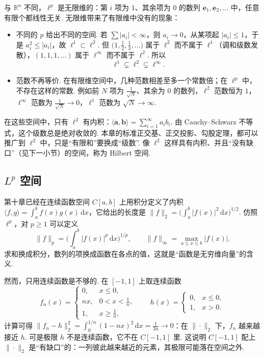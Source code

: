 \documentclass[lang=cn,10.5pt,scheme=chinese,toc=twocol,section,chinesefont=nofont,
twoside,citestyle=gb7714-2015,bibstyle=gb7714-2015]{elegantbook}
\DeclareRobustCommand{\textbf}[1]{{\lnsemiboldlatin\lnsemiboldcjk #1}}
\newcommand{\vv}[1]{\boldsymbol{#1}}
\numberwithin{equation}{section}   %
\begin{document}
与 $\mathbb{R}^n$ 不同，$\ell^p$ 是无限维的：第 $i$ 项为 $1$、其余项为 $0$ 的数列 $\vv e_1,\vv e_2,\ldots$ 中，任意有限个都线性无关. 无限维带来了有限维中没有的现象：
\begin{itemize}
  \item \textbf{不同的 $p$ 给出不同的空间.} 若 $\sum|a_i|<\infty$，则 $a_i\to0$，从某项起 $|a_i|\le1$，于是 $a_i^2\le|a_i|$，故 $\ell^1\subset\ell^2$. 但 $\big(1,\frac12,\frac13,\ldots\big)$ 属于 $\ell^2$ 而不属于 $\ell^1$（调和级数发散），$(1,1,1,\ldots)$ 属于 $\ell^\infty$ 而不属于 $\ell^2$. 所以
        \[\ell^1\subsetneq\ell^2\subsetneq\ell^\infty.\]
  \item \textbf{范数不再等价.} 在有限维空间中，几种范数相差至多一个常数倍；在 $\ell^p$ 中，不存在这样的常数. 例如前 $N$ 项为 $\frac1{\sqrt N}$、其余为 $0$ 的数列，$\ell^2$ 范数恒为 $1$，$\ell^\infty$ 范数为 $\frac1{\sqrt N}\to0$，$\ell^1$ 范数为 $\sqrt N\to\infty$.
\end{itemize}

在这些空间中，只有 $\ell^2$ 有内积：$\langle\vv a,\vv b\rangle=\sum_{i=1}^\infty a_ib_i$. 由 Cauchy–Schwarz 不等式，这个级数总是绝对收敛的. 本章的标准正交基、正交投影、勾股定理，都可以推广到 $\ell^2$ 中，只是“有限和”要换成“级数”. 像 $\ell^2$ 这样具有内积、并且“没有缺口”（见下一小节）的空间，称为 \textbf{Hilbert 空间}.

\subsection{\texorpdfstring{$L^p$}{Lp} 空间}

第十章已经在连续函数空间 $C[a,b]$ 上用积分定义了内积 $\langle f,g\rangle=\int_a^bf(x)g(x)\,\mathrm dx$，它给出的长度是 $\|f\|_2=\big(\int_a^b|f(x)|^2\,\mathrm dx\big)^{1/2}$. 仿照 $\ell^p$，对 $p\ge1$ 可以定义
\[
  \|f\|_p=\Big(\int_a^b|f(x)|^p\,\mathrm dx\Big)^{1/p},\qquad \|f\|_\infty=\max_{a\le x\le b}|f(x)|.
\]
求和换成积分，数列的项换成函数在各点的值，这就是“函数是无穷维向量”的含义.

然而，只用连续函数是不够的. 在 $[-1,1]$ 上取连续函数
\[
  f_n(x)=
  \begin{cases}
    0, & x\le0, \\ nx,&0<x<\frac1n,\\ 1,&x\ge\frac1n,
  \end{cases}
  \qquad h(x)=
  \begin{cases}
    0, & x\le0, \\ 1,&x>0.
  \end{cases}
\]
计算可得 $\|f_n-h\|_2^2=\int_0^{1/n}(1-nx)^2\,\mathrm dx=\frac1{3n}\to0$：在 $\|\cdot\|_2$ 下，$f_n$ 越来越接近 $h$. 可是极限 $h$ 不是连续函数，它不在 $C[-1,1]$ 里. 这说明 $C[-1,1]$ 配上 $\|\cdot\|_2$ 是“有缺口”的：一列彼此越来越近的元素，其极限可能落在空间之外.
\end{document}
